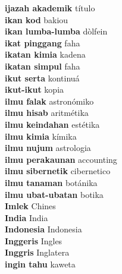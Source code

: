 \textbf{ ijazah akademik  } título \\
\textbf{ ikan kod  } bakiou \\
\textbf{ ikan lumba-lumba  } dòlfein \\
\textbf{ ikat pinggang  } faha \\
\textbf{ ikatan kimia  } kadena \\
\textbf{ ikatan simpul  } faha \\
\textbf{ ikut serta  } kontinuá \\
\textbf{ ikut-ikut  } kopia \\
\textbf{ ilmu falak  } astronómiko \\
\textbf{ ilmu hisab  } aritmétika \\
\textbf{ ilmu keindahan  } estétika \\
\textbf{ ilmu kimia  } kímika \\
\textbf{ ilmu nujum  } astrologia \\
\textbf{ ilmu perakaunan  } accounting \\
\textbf{ ilmu sibernetik  } cibernetico \\
\textbf{ ilmu tanaman  } botánika \\
\textbf{ ilmu ubat-ubatan  } botika \\
\textbf{ Imlek  } Chines \\
\textbf{ India  } India \\
\textbf{ Indonesia  } Indonesia \\
\textbf{ Inggeris  } Ingles \\
\textbf{ Inggris  } Inglatera \\
\textbf{ ingin tahu  } kaweta \\
